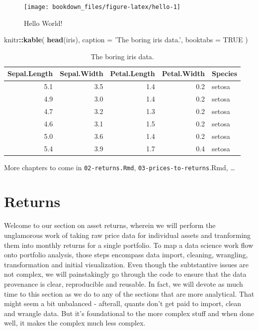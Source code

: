 \documentclass[]{krantz}
\makeatletter
\newenvironment{Shaded}{\begin{snugshade}}{\end{snugshade}}
\newcommand{\KeywordTok}[1]{\textcolor[rgb]{0.13,0.29,0.53}{\textbf{#1}}}
\newcommand{\DataTypeTok}[1]{\textcolor[rgb]{0.13,0.29,0.53}{#1}}
\newcommand{\StringTok}[1]{\textcolor[rgb]{0.31,0.60,0.02}{#1}}
\newcommand{\OtherTok}[1]{\textcolor[rgb]{0.56,0.35,0.01}{#1}}
\newcommand{\OperatorTok}[1]{\textcolor[rgb]{0.81,0.36,0.00}{\textbf{#1}}}
\newcommand{\NormalTok}[1]{#1}
\newenvironment{kframe}{%
\medskip{}
\setlength{\fboxsep}{.8em}
 \def\at@end@of@kframe{}%
 \ifinner\ifhmode%
  \def\at@end@of@kframe{\end{minipage}}%
  \begin{minipage}{\columnwidth}%
 \fi\fi%
 \def\FrameCommand##1{\hskip\@totalleftmargin \hskip-\fboxsep
 \colorbox{shadecolor}{##1}\hskip-\fboxsep
     \hskip-\linewidth \hskip-\@totalleftmargin \hskip\columnwidth}%
 \MakeFramed {\advance\hsize-\width
   \@totalleftmargin\z@ \linewidth\hsize
   \@setminipage}}%
 {\par\unskip\endMakeFramed%
 \at@end@of@kframe}
\renewenvironment{Shaded}{\begin{kframe}}{\end{kframe}}
\makeatother
\begin{document}
\begin{figure}
\texttt{[image: bookdown\_files/figure-latex/hello-1]} \caption{Hello World!}\label{fig:hello}
\end{figure}

\begin{Shaded}
\begin{Highlighting}[]
\NormalTok{knitr}\OperatorTok{::}\KeywordTok{kable}\NormalTok{(}
  \KeywordTok{head}\NormalTok{(iris), }\DataTypeTok{caption =} \StringTok{'The boring iris data.'}\NormalTok{,}
  \DataTypeTok{booktabs =} \OtherTok{TRUE}
\NormalTok{)}
\end{Highlighting}
\end{Shaded}

\begin{table}

\caption{\label{tab:iris}The boring iris data.}
\centering
\begin{tabular}[t]{rrrrl}
\toprule
Sepal.Length & Sepal.Width & Petal.Length & Petal.Width & Species\\
\midrule
5.1 & 3.5 & 1.4 & 0.2 & setosa\\
4.9 & 3.0 & 1.4 & 0.2 & setosa\\
4.7 & 3.2 & 1.3 & 0.2 & setosa\\
4.6 & 3.1 & 1.5 & 0.2 & setosa\\
5.0 & 3.6 & 1.4 & 0.2 & setosa\\
5.4 & 3.9 & 1.7 & 0.4 & setosa\\
\bottomrule
\end{tabular}
\end{table}

More chapters to come in \texttt{02-returns.Rmd},
\texttt{03-prices-to-returns}.Rmd, \ldots{}

\chapter*{Returns}\label{returns}


Welcome to our section on asset returns, wherein we will perform the
unglamorous work of taking raw price data for individual assets and
tranforming them into monthly returns for a single portfolio. To map a
data science work flow onto portfolio analysis, those steps encompass
data import, cleaning, wrangling, transformation and initial
visualization. Even though the subtstantive issues are not complex, we
will painstakingly go through the code to ensure that the data
provenance is clear, reproducible and reusable. In fact, we will devote
as much time to this section as we do to any of the sections that are
more analytical. That might seem a bit unbalanced - afterall, quants
don't get paid to import, clean and wrangle data. But it's foundational
to the more complex stuff and when done well, it makes the complex much
less complex.
\end{document}
